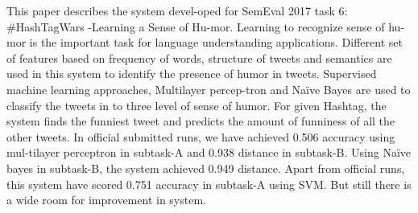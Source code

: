 This paper describes the system devel-oped for SemEval 2017 task 6: \#HashTagWars -Learning a Sense of Hu-mor. Learning to recognize sense of hu-mor is the important task for language understanding applications. Different set of features based on frequency of words, structure of tweets and semantics are used in this system to identify the presence of humor in tweets. Supervised machine learning approaches, Multilayer percep-tron and Naïve Bayes are used to classify the tweets in to three level of sense of humor. For given Hashtag, the system finds the funniest tweet and predicts the amount of funniness of all the other tweets. In official submitted runs, we have achieved 0.506 accuracy using mul-tilayer perceptron in subtask-A and 0.938 distance in subtask-B. Using Naïve bayes in subtask-B, the system achieved 0.949 distance. Apart from official runs, this system have scored 0.751 accuracy in subtask-A using SVM. But still there is a wide room for improvement in system.
